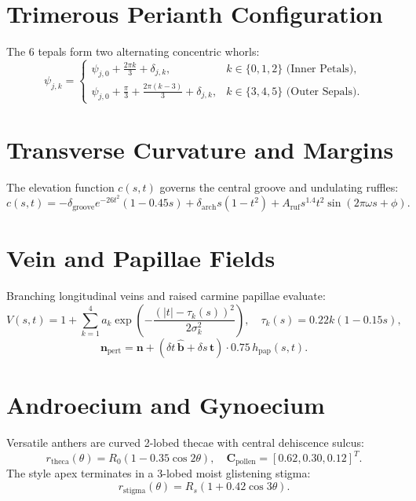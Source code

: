 \documentclass[10pt,twocolumn]{article}
\begin{document}
\section{Trimerous Perianth Configuration}
The 6 tepals form two alternating concentric whorls:
\begin{equation}
\psi_{j,k} = \begin{cases}
\psi_{j,0} + \frac{2\pi k}{3} + \delta_{j,k}, & k \in \{0, 1, 2\} \text{ (Inner Petals)}, \\
\psi_{j,0} + \frac{\pi}{3} + \frac{2\pi(k-3)}{3} + \delta_{j,k}, & k \in \{3, 4, 5\} \text{ (Outer Sepals)}.
\end{cases}
\end{equation}

\section{Transverse Curvature and Margins}
The elevation function $c(s, t)$ governs the central groove and undulating ruffles:
\begin{equation}
c(s, t) = -\delta_{\mathrm{groove}} e^{-26 t^2}(1 - 0.45s) + \delta_{\mathrm{arch}} s(1 - t^2) + A_{\mathrm{ruf}} s^{1.4} t^2 \sin(2\pi\omega s + \phi).
\end{equation}

\section{Vein and Papillae Fields}
Branching longitudinal veins and raised carmine papillae evaluate:
\begin{equation}
V(s, t) = 1 + \sum_{k=1}^4 a_k \exp\left(-\frac{(|t| - \tau_k(s))^2}{2\sigma_k^2}\right), \quad \tau_k(s) = 0.22 k (1 - 0.15s),
\end{equation}
\begin{equation}
\mathbf{n}_{\mathrm{pert}} = \mathbf{n} + (\delta t\,\hat{\mathbf{b}} + \delta s\,\hat{\mathbf{t}}) \cdot 0.75\,h_{\mathrm{pap}}(s, t).
\end{equation}

\section{Androecium and Gynoecium}
Versatile anthers are curved 2-lobed thecae with central dehiscence sulcus:
\begin{equation}
r_{\mathrm{theca}}(\theta) = R_0 (1 - 0.35 \cos 2\theta), \quad \mathbf{C}_{\mathrm{pollen}} = [0.62, 0.30, 0.12]^T.
\end{equation}
The style apex terminates in a 3-lobed moist glistening stigma:
\begin{equation}
r_{\mathrm{stigma}}(\theta) = R_s (1 + 0.42 \cos 3\theta).
\end{equation}
\end{document}

